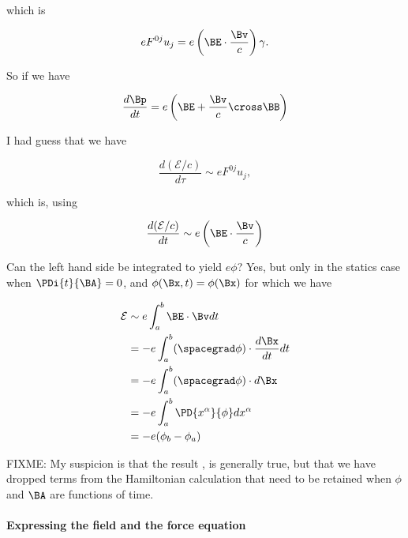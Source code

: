 {which is

\begin{equation}\label{eqn:relativisticElectrodynamicsT3:910}
e F^{0 j} u_j = e \left(\BE \cdot \frac{\Bv}{c}\right) \gamma.
\end{equation}

So if we have

\begin{equation}\label{eqn:relativisticElectrodynamicsT3:920}
\frac{d\Bp}{dt} = e \left( \BE + \frac{\Bv}{c} \cross \BB \right)
\end{equation}

I had guess that we have

\begin{equation}\label{eqn:relativisticElectrodynamicsT3:940}
\frac{d(\mathcal{E}/c)}{d\tau} \sim e F^{0 j} u_j,
\end{equation}

which is, using 

\begin{equation}\label{eqn:relativisticElectrodynamicsT3:950}
\frac{d(\mathcal{E}/c)}{dt} \sim e \left(\BE \cdot \frac{\Bv}{c}\right)
\end{equation}

Can the left hand side be integrated to yield \(e \phi\)?  Yes, but only in the statics case when \(\PDi{t}{\BA} = 0\), and \(\phi(\Bx,t) = \phi(\Bx)\) for which we have

\begin{equation}\label{eqn:relativisticElectrodynamicsT3:1110}
\begin{aligned}
\mathcal{E} 
&\sim e \int_a^b \BE \cdot \Bv dt \\
&= -e \int_a^b (\spacegrad \phi) \cdot \frac{d \Bx}{dt} dt \\
&= -e \int_a^b (\spacegrad \phi) \cdot d \Bx \\
&= -e \int_a^b \PD{x^\alpha}{\phi} d x^\alpha \\
&= -e (\phi_b - \phi_a)
\end{aligned}
\end{equation}

FIXME: My suspicion is that the result , is generally true, but that we have dropped terms from the Hamiltonian calculation that need to be retained when \(\phi\) and \(\BA\) are functions of time.

\paragraph{Expressing the field and the force equation}

}

